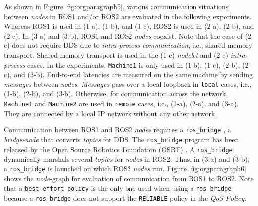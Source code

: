 \documentclass{sig-alternate-05-2015}
\begin{document}
As shown in Figure \ref{fig:orgparagraph5}, various communication situations between \emph{nodes} in ROS1 and/or ROS2 are evaluated in the following experiments.
Whereas ROS1 is used in (1-a), (1-b), and (1-c), ROS2 is used in (2-a), (2-b), and (2-c). 
In (3-a) and (3-b), ROS1 and ROS2 \emph{nodes} coexist.
Note that the case of (2-c) does not require DDS due to \emph{intra-process communication}, i.e., shared memory transport.
Shared memory transport is used in the (1-c) \emph{nodelet} and (2-c) \emph{intra-process} cases.
In the experiments, \texttt{Machine1} is only used in (1-b), (1-c), (2-b), (2-c), and (3-b).
End-to-end latencies are measured on the same machine by sending \emph{messages} between \emph{nodes}.
\emph{Messages} pass over a local loopback in \texttt{local} cases, i.e.,  (1-b), (2-b), and (3-b).
Otherwise, for communication across the network, \texttt{Machine1} and \texttt{Machine2} are used in \texttt{remote} cases, i.e., (1-a), (2-a), and (3-a).
They are connected by a local IP network without any other network.

Communication between ROS1 and ROS2 \emph{nodes} requires a \texttt{ros\_bridge} \cite{ros2@roscon2015}, a \emph{bridge-node} that converts \emph{topics} for DDS. 
The \texttt{ros\_bridge} program has been released by the Open Source Robotics Foundation (OSRF) \cite{osrf}.
A \texttt{ros\_bridge} dynamically marshals several \emph{topics} for \emph{nodes} in ROS2. 
Thus, in (3-a) and (3-b), a \texttt{ros\_bridge} is launched on which ROS2 \emph{nodes} run.
Figure \ref{fig:orgparagraph6} shows the \emph{node}-graph for evaluation of communication from ROS1 to ROS2.
Note that a \texttt{best-effort policy} is the only one used when using a \texttt{ros\_bridge} because a \texttt{ros\_bridge} does not support the \texttt{RELIABLE} policy in the \emph{QoS Policy}. 

\end{document}
